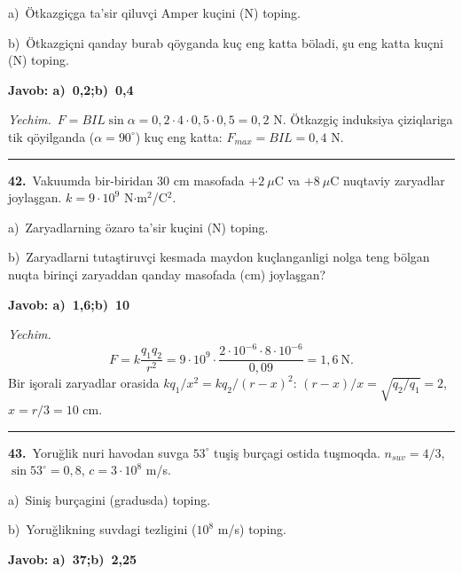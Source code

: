 \documentclass[11pt,a4paper]{article}
\begin{document}
\noindent\hspace*{4mm}a)\ Ötkazgiçga ta’sir qiluvçi Amper kuçini (N) toping.\par
\noindent\hspace*{4mm}b)\ Ötkazgiçni qanday burab qöyganda kuç eng katta böladi, şu eng katta kuçni (N) toping.\par
\noindent\colorbox{gray!12}{\parbox{\dimexpr\linewidth-2\fboxsep}{\textbf{Javob: a)\ 0,2;\quad b)\ 0,4}}}\par\smallskip
\noindent\textit{Yechim.}\ $F=BIL\sin\alpha=0{,}2\cdot4\cdot0{,}5\cdot0{,}5=0{,}2$ N. Ötkazgiç induksiya çiziqlariga tik qöyilganda ($\alpha=90^\circ$) kuç eng katta: $F_{max}=BIL=0{,}4$ N.\par\par\medskip\hrule\medskip
{}\noindent\textbf{42.}\ Vakuumda bir-biridan 30 cm masofada $+2\ \mu$C va $+8\ \mu$C nuqtaviy zaryadlar joylaşgan. $k=9\cdot10^9$ N$\cdot$m$^2$/C$^2$.\par
\noindent\hspace*{4mm}a)\ Zaryadlarning özaro ta’sir kuçini (N) toping.\par
\noindent\hspace*{4mm}b)\ Zaryadlarni tutaştiruvçi kesmada maydon kuçlanganligi nolga teng bölgan nuqta birinçi zaryaddan qanday masofada (cm) joylaşgan?\par
\noindent\colorbox{gray!12}{\parbox{\dimexpr\linewidth-2\fboxsep}{\textbf{Javob: a)\ 1,6;\quad b)\ 10}}}\par\smallskip
\noindent\textit{Yechim.}\ \[F=k\frac{q_1q_2}{r^2}=9\cdot10^9\cdot\frac{2\cdot10^{-6}\cdot8\cdot10^{-6}}{0{,}09}=1{,}6\ \text{N}.\]
Bir işorali zaryadlar orasida $kq_1/x^2=kq_2/(r-x)^2$: $(r-x)/x=\sqrt{q_2/q_1}=2$, $x=r/3=10$ cm.\par\par\medskip\hrule\medskip
{}\noindent\textbf{43.}\ Yoruğlik nuri havodan suvga $53^\circ$ tuşiş burçagi ostida tuşmoqda. $n_{suv}=4/3$, $\sin53^\circ=0{,}8$, $c=3\cdot10^8$ m/s.\par
\noindent\hspace*{4mm}a)\ Siniş burçagini (gradusda) toping.\par
\noindent\hspace*{4mm}b)\ Yoruğlikning suvdagi tezligini ($10^8$ m/s) toping.\par
\noindent\colorbox{gray!12}{\parbox{\dimexpr\linewidth-2\fboxsep}{\textbf{Javob: a)\ 37;\quad b)\ 2,25}}}\par\smallskip
\end{document}
